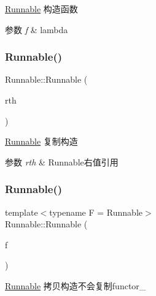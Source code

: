 \hyperlink{classRunnable}{Runnable} 构造函数 


\begin{DoxyParams}{参数}
{\em f} & lambda \\
\hline
\end{DoxyParams}
\mbox{\label{classRunnable_ab2054720a62d059c59d0e8085d3be78e}} 
\subsubsection{\texorpdfstring{Runnable()}{Runnable()}\hspace{0.1cm}{\footnotesize\ttfamily [2/3]}}
{\footnotesize\ttfamily Runnable\+::\+Runnable (\begin{DoxyParamCaption}\item[{\hyperlink{classRunnable}{Runnable} \&\&}]{rth }\end{DoxyParamCaption})\hspace{0.3cm}{\ttfamily [inline]}}



\hyperlink{classRunnable}{Runnable} 复制构造 


\begin{DoxyParams}{参数}
{\em rth} & Runnable右值引用 \\
\hline
\end{DoxyParams}
\mbox{\label{classRunnable_aaac34b8a861ab506499f8ec791e7cc16}} 
\subsubsection{\texorpdfstring{Runnable()}{Runnable()}\hspace{0.1cm}{\footnotesize\ttfamily [3/3]}}
{\footnotesize\ttfamily template$<$typename F  = Runnable$>$ \\
Runnable\+::\+Runnable (\begin{DoxyParamCaption}\item[{F \&}]{f }\end{DoxyParamCaption})\hspace{0.3cm}{\ttfamily [inline]}}



\hyperlink{classRunnable}{Runnable} 拷贝构造不会复制functor\+\_\+ 


